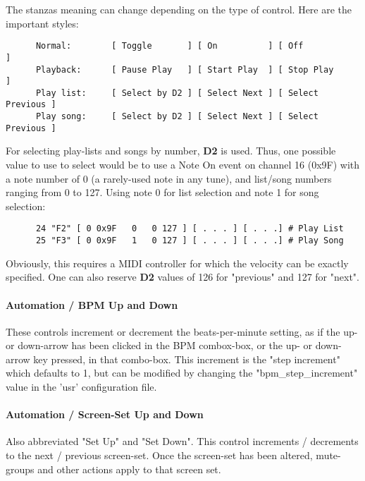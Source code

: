    The stanzas meaning can change depending on the type of control.  Here are
   the important styles:

   \begin{verbatim}
      Normal:        [ Toggle       ] [ On          ] [ Off             ]
      Playback:      [ Pause Play   ] [ Start Play  ] [ Stop Play       ]
      Play list:     [ Select by D2 ] [ Select Next ] [ Select Previous ]
      Play song:     [ Select by D2 ] [ Select Next ] [ Select Previous ]
   \end{verbatim}

   For selecting play-lists and songs by number, \textbf{D2} is used.
   Thus, one possible value to use to select would be to use a 
   Note On event on channel 16 (0x9F) with a note number of 0 (a rarely-used
   note in any tune), and list/song numbers ranging from 0 to 127.  Using note
   0 for list selection and note 1 for song selection:

   \begin{verbatim}
      24 "F2" [ 0 0x9F   0   0 127 ] [ . . . ] [ . . .] # Play List
      25 "F3" [ 0 0x9F   1   0 127 ] [ . . . ] [ . . .] # Play Song
   \end{verbatim}

   Obviously, this requires a MIDI controller for which the velocity can be
   exactly specified.  One can also reserve \textbf{D2} values of 126 for
   "previous" and 127 for "next".

\paragraph{Automation / BPM Up and Down}
\label{paragraph:configuration_midi_ctrl_bpmupdn}

   These controls increment or decrement the beats-per-minute setting, as if
   the up- or down-arrow has been clicked in the BPM combox-box, or the up- or
   down-arrow key pressed, in that combo-box.
   This increment is the
   "step increment" which defaults to 1, but can be modified by
   changing the "bpm\_step\_increment" value in the 'usr'
   configuration file.

\paragraph{Automation / Screen-Set Up and Down}
\label{paragraph:configuration_midi_ctrl_ssupdn}

   Also abbreviated "Set Up" and "Set Down".
   This control increments / decrements to the next / previous screen-set. 
   Once the screen-set has been altered, mute-groups and other
   actions apply to that screen set.

